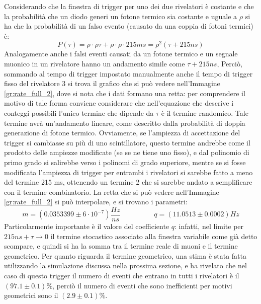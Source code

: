 Considerando che la finestra di trigger per uno dei due rivelatori è costante e che la probabilità che un diodo generi un fotone termico sia costante e uguale a $\rho$ si ha che la probabilità di un falso evento (causato da una coppia di fotoni termici) è:
\begin{equation}
  P(\tau)= \rho \cdot \rho \tau + \rho \cdot \rho \cdot 215 ms = \rho^2 (\tau + 215 ns) 
\end{equation}
Analogamente anche i falsi eventi causati da un fotone termico e un segnale muonico in un rivelatore hanno un andamento simile come $\tau +215 ns$,
Perciò, sommando al tempo di trigger impostato manualmente anche il tempo di trigger fisso del rivelatore $3$ si trova il grafico che si può vedere nell'Immagine \ref{gr:rate_full_2}, dove si nota che i dati formano una retta: per comprendere il motivo di tale forma conviene considerare che nell'equazione che descrive i conteggi possibili l'unico termine che dipende da $\tau$ è il termine randomico.
Tale termine avrà un'andamento lineare, come descritto dalla probabilità di doppia generazione di fotone termico. 
Ovviamente, se l'ampiezza di accettazione del trigger si cambiasse su più di uno scintillatore, questo termine andrebbe come il prodotto delle ampiezze modificate (se se ne tiene uno fisso), e dal polinomio di primo grado si salirebbe verso i polinomi di grado superiore, mentre se si fosse modificata l'ampiezza di trigger per entrambi i rivelatori si sarebbe fatto a meno del termine 215 ms, ottenendo un termine 2 che si sarebbe andato a semplificare con il termine combinatorio.
La retta che si può vedere nell'Immagine \ref{gr:rate_full_2} si può interpolare, e si trovano i parametri:
\begin{equation}
  m = (0.0353399 \pm 6 \cdot 10^{-7}) \frac{Hz}{ns} \hspace{2cm} q = (11.0513 \pm 0.0002) Hz
\end{equation}
Particolarmente importante è il valore del coefficiente $q$: infatti, nel limite per $ 215 ns + \tau \to 0$ il termine stocastico associato alla finestra variabile come già detto scompare, e quindi si ha la somma tra il termine reale di muoni e il termine geometrico. Per quanto riguarda il termine geometrico, una stima è stata fatta utilizzando la simulazione discussa nella prossima sezione, e ha rivelato che nel caso di questo trigger il numero di eventi che entrano in tutti i rivelatori è il $(97.1 \pm 0.1) \%$, perciò il numero di eventi che sono inefficienti per motivi geometrici sono il $(2.9 \pm 0.1) \%$.\\

